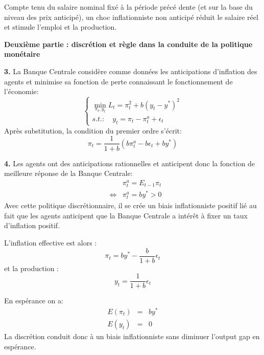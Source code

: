 \documentclass[11pt,a4paper]{article}
\begin{document}
Compte tenu du salaire nominal fix\'{e} \`{a} la p\'{e}riode pr\'{e}c\'{e}%
dente (et sur la base du niveau des prix anticip\'{e}), un choc
inflationniste non anticip\'{e} r\'{e}duit le salaire r\'{e}el et stimule
l'emploi et la production.

\bigskip

\noindent \textbf{Deuxi\`{e}me partie : discr\'{e}tion et r\`{e}gle dans la
conduite de la politique mon\'{e}taire}

\noindent \textbf{3.} La Banque Centrale consid\`ere comme donn\'ees les
anticipations d'inflation des agents et minimise sa fonction de perte
connaissant le fonctionnement de l'\'economie: 
\begin{equation*}
\left\{%
\begin{array}{l}
\min_{\pi_t,y_t} L_t=\pi_t^2+b(y_t-y^\ast)^2 \\ 
s.t.:\quad y_t=\pi_t-\pi_t^a+\epsilon_t%
\end{array}%
\right.
\end{equation*}
Apr\`es substitution, la condition du premier ordre s'\'ecrit:%
\begin{equation*}
\pi_t=\frac{1}{1+b}(b\pi_t^a-b \epsilon_t+b y^\ast)
\end{equation*}

\noindent \textbf{4.} Les agents ont des anticipations rationnelles et
anticipent donc la fonction de meilleure r\'{e}ponse de la Banque Centrale: 
\begin{eqnarray*}
&&\pi _{t}^{a}=E_{t-1}\pi _{t} \\
&\Leftrightarrow &\pi _{t}^{a}=by^{\ast }>0
\end{eqnarray*}%
Avec cette politique discr\'{e}tionnaire, il se cr\'{e}e un biais
inflationniste positif li\'{e} au fait que les agents anticipent que la
Banque Centrale a int\'{e}r\^{e}t \`{a} fixer un taux d'inflation positif.

\noindent L'inflation effective est alors : 
\begin{equation*}
\pi _{t}=by^{\ast }-\frac{b}{1+b}\epsilon _{t}
\end{equation*}%
et la production : 
\begin{equation*}
y_{t}=\frac{1}{1+b}\epsilon _{t}
\end{equation*}

\noindent En esp\'erance on a: 
\begin{eqnarray*}
E(\pi_t)&=&by^\ast \\
E(y_t)&=&0
\end{eqnarray*}
La discr\'etion conduit donc \`a un biais inflationniste sans diminuer
l'output gap en esp\'erance.
\end{document}
